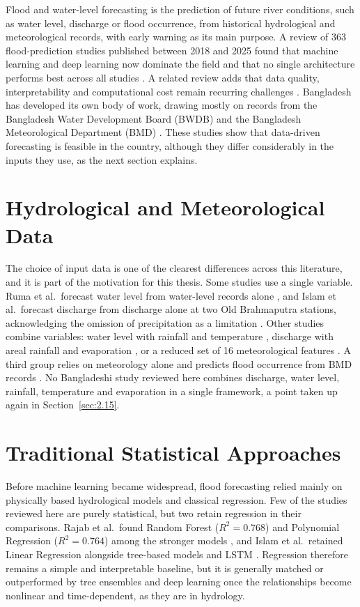 Flood and water-level forecasting is the prediction of future river
conditions, such as water level, discharge or flood occurrence, from
historical hydrological and meteorological records, with early warning as its
main purpose. A review of 363 flood-prediction studies published between 2018
and 2025 found that machine learning and deep learning now dominate the field
and that no single architecture performs best across all studies
\cite{Aghenda2025}. A related review adds that data quality, interpretability
and computational cost remain recurring challenges \cite{Kumar2023}. Bangladesh
has developed its own body of work, drawing mostly on records from the
Bangladesh Water Development Board (BWDB) and the Bangladesh Meteorological
Department (BMD)
\cite{Islam2026a,Islam2026b,Ruma2023,Rakin2023,Rajab2023,HemelSakib2024}.
These studies show that data-driven forecasting is feasible in the country,
although they differ considerably in the inputs they use, as the next section
explains.

\section{Hydrological and Meteorological Data}
\label{sec:2.3}

The choice of input data is one of the clearest differences across this
literature, and it is part of the motivation for this thesis. Some studies use
a single variable. Ruma et al.\ forecast water level from water-level records
alone \cite{Ruma2023}, and Islam et al.\ forecast discharge from discharge
alone at two Old Brahmaputra stations, acknowledging the omission of
precipitation as a limitation \cite{Islam2026a}. Other studies combine
variables: water level with rainfall and temperature \cite{Islam2026b},
discharge with areal rainfall and evaporation \cite{Cui2022}, or a reduced set
of 16 meteorological features \cite{Rajab2023}. A third group relies on
meteorology alone and predicts flood occurrence from BMD records
\cite{Rakin2023,HemelSakib2024}. No Bangladeshi study reviewed here combines
discharge, water level, rainfall, temperature and evaporation in a single
framework, a point taken up again in Section~\ref{sec:2.15}.

\section{Traditional Statistical Approaches}
\label{sec:2.4}

Before machine learning became widespread, flood forecasting relied mainly on
physically based hydrological models and classical regression. Few of the
studies reviewed here are purely statistical, but two retain regression in
their comparisons. Rajab et al.\ found Random Forest ($R^2 = 0.768$) and
Polynomial Regression ($R^2 = 0.764$) among the stronger models
\cite{Rajab2023}, and Islam et al.\ retained Linear Regression alongside
tree-based models and LSTM \cite{Islam2026b}. Regression therefore remains a
simple and interpretable baseline, but it is generally matched or outperformed
by tree ensembles and deep learning once the relationships become nonlinear
and time-dependent, as they are in hydrology.

